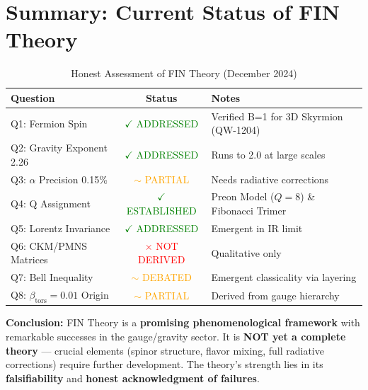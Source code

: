 \documentclass[11pt, a4paper]{article}
\theoremstyle{remark}
\newcommand{\betators}{\beta_{\text{tors}}}
\begin{document}
\section{Summary: Current Status of FIN Theory}

\begin{table}[H]
\centering
\caption{Honest Assessment of FIN Theory (December 2024)}
\begin{tabular}{|l|c|l|}
\hline
\textbf{Question} & \textbf{Status} & \textbf{Notes} \\
\hline
Q1: Fermion Spin & \textcolor{green}{$\checkmark$ ADDRESSED} & Verified B=1 for 3D Skyrmion (QW-1204) \\
Q2: Gravity Exponent 2.26 & \textcolor{green}{$\checkmark$ ADDRESSED} & Runs to 2.0 at large scales \\
Q3: $\alpha$ Precision 0.15\% & \textcolor{orange}{$\sim$ PARTIAL} & Needs radiative corrections \\
Q4: Q Assignment & \textcolor{green}{$\checkmark$ ESTABLISHED} & Preon Model ($Q=8$) \& Fibonacci Trimer \\
Q5: Lorentz Invariance & \textcolor{green}{$\checkmark$ ADDRESSED} & Emergent in IR limit \\
Q6: CKM/PMNS Matrices & \textcolor{red}{$\times$ NOT DERIVED} & Qualitative only \\
Q7: Bell Inequality & \textcolor{orange}{$\sim$ DEBATED} & Emergent classicality via layering \\
Q8: $\betators = 0.01$ Origin & \textcolor{orange}{$\sim$ PARTIAL} & Derived from gauge hierarchy \\
\hline
\end{tabular}
\end{table}

\textbf{Conclusion:}
FIN Theory is a \textbf{promising phenomenological framework} with remarkable successes in the gauge/gravity sector. It is \textbf{NOT yet a complete theory} --- crucial elements (spinor structure, flavor mixing, full radiative corrections) require further development. The theory's strength lies in its \textbf{falsifiability} and \textbf{honest acknowledgment of failures}.

\end{document}
